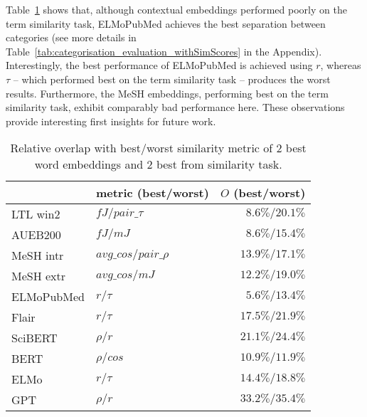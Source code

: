 \documentclass[letterpaper]{article} %
\begin{document}
Table~\ref{tab:categorisation_evaluation} shows that, although contextual embeddings performed poorly on the term similarity task, ELMoPubMed achieves the best separation between categories (see more details in Table~\ref{tab:categorisation_evaluation_withSimScores} in the Appendix). 
Interestingly, the best performance of ELMoPubMed is achieved using $r$, whereas $\tau$ -- which performed best on the term similarity task -- produces the worst results. 
Furthermore, the MeSH embeddings, performing best on the term similarity task, exhibit comparably bad performance here.
These observations provide interesting first insights for future work.

\begin{table}[th]
    \centering
    \small
    \begin{tabular}{l l r}
         & metric (best/worst) & $O$ (best/worst)\\ 
         \midrule
LTL win2  & $fJ / pair\_\tau$ & $8.6\% / 20.1\%$ \\
AUEB200 & $fJ / mJ$ & $8.6\%/15.4\%$ \\
MeSH intr & $avg\_cos / pair\_\rho$ & $13.9\% / 17.1\%$ \\
MeSH extr & $avg\_cos / mJ$ & $12.2\% / 19.0\%$ \\
\midrule
ELMoPubMed & $r / \tau$  &$5.6\% /13.4\% $ \\
Flair & $r / \tau$ &$17.5\%/21.9\%$\\
SciBERT & $\rho / r$ &$21.1\% /24.4\%$\\
BERT & $\rho / cos$ &$10.9\%/11.9\%$ \\
ELMo & $r / \tau$ &$14.4\%/18.8\%$ \\
GPT & $\rho / r$ &$33.2\%/35.4\%$ \\
    \end{tabular}
    \caption{Relative overlap with best/worst similarity metric of 2 best word embeddings and 2 best from similarity task.}
    \label{tab:categorisation_evaluation} 
\end{table}


\end{document}
